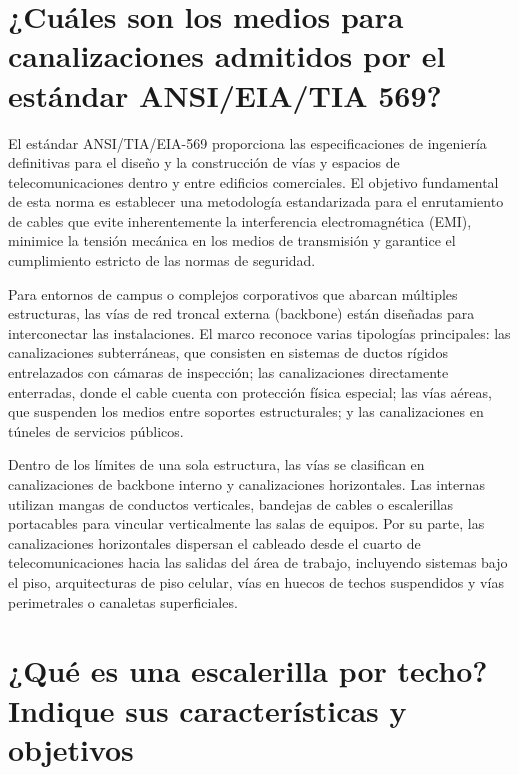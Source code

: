 \documentclass[a4paper,12pt]{article}
\begin{document}
\setcounter{page}{1}

\tableofcontents


\newpage

\section{¿Cuáles son los medios para canalizaciones admitidos por el estándar ANSI/EIA/TIA 569?}

El estándar ANSI/TIA/EIA-569 proporciona las especificaciones de ingeniería definitivas para el diseño y la construcción de vías y espacios de telecomunicaciones dentro y entre edificios comerciales. El objetivo fundamental de esta norma es establecer una metodología estandarizada para el enrutamiento de cables que evite inherentemente la interferencia electromagnética (EMI), minimice la tensión mecánica en los medios de transmisión y garantice el cumplimiento estricto de las normas de seguridad. 

Para entornos de campus o complejos corporativos que abarcan múltiples estructuras, las vías de red troncal externa (backbone) están diseñadas para interconectar las instalaciones. El marco reconoce varias tipologías principales: las canalizaciones subterráneas, que consisten en sistemas de ductos rígidos entrelazados con cámaras de inspección; las canalizaciones directamente enterradas, donde el cable cuenta con protección física especial; las vías aéreas, que suspenden los medios entre soportes estructurales; y las canalizaciones en túneles de servicios públicos.

Dentro de los límites de una sola estructura, las vías se clasifican en canalizaciones de backbone interno y canalizaciones horizontales. Las internas utilizan mangas de conductos verticales, bandejas de cables o escalerillas portacables para vincular verticalmente las salas de equipos. Por su parte, las canalizaciones horizontales dispersan el cableado desde el cuarto de telecomunicaciones hacia las salidas del área de trabajo, incluyendo sistemas bajo el piso, arquitecturas de piso celular, vías en huecos de techos suspendidos y vías perimetrales o canaletas superficiales.

\section{¿Qué es una escalerilla por techo? Indique sus características y objetivos}
\end{document}

